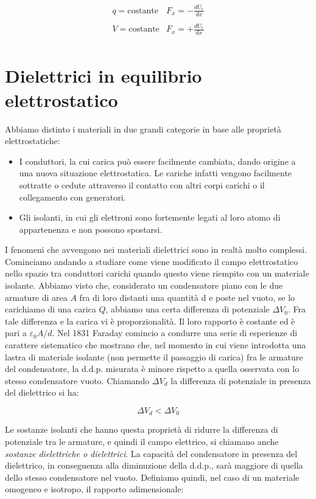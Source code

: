 \[
	\boxed{\begin{array}{rl}
		 	q = \text{costante} & F_x = - \frac{dU_e}{dx} \\ \\
			V = \text{costante} & F_x = + \frac{dU_e}{dx} \\
		\end{array}}
\]

\section{Dielettrici in equilibrio elettrostatico}

Abbiamo distinto i materiali in due grandi categorie in base alle proprietà elettrostatiche:

\begin{itemize}
	\item I conduttori, la cui carica può essere facilmente cambiata, dando origine a una nuova situazione elettrostatica. Le cariche infatti vengono facilmente sottratte o cedute attraverso il contatto con altri corpi carichi o il collegamento con generatori.
	\item Gli isolanti, in cui gli elettroni sono fortemente legati al loro atomo di appartenenza e non possono spostarsi.
\end{itemize}

I fenomeni che avvengono nei materiali dielettrici sono in realtà molto complessi. Cominciamo andando a studiare come viene modificato il campo elettrostatico nello spazio tra conduttori carichi quando questo viene riempito con un materiale isolante. Abbiamo visto che, considerato un condensatore piano con le due armature di area $A$ fra di loro distanti una quantità d e poste nel vuoto, se lo carichiamo di una carica $Q$, abbiamo una certa differenza di potenziale $\Delta V_0 $. Fra tale differenza e la carica vi è proporzionalità. Il loro rapporto è costante ed è pari a $ \varepsilon_0 A / d $. Nel 1831 Faraday comincio a condurre una serie di esperienze di carattere sistematico che mostrano che, nel momento in cui viene introdotta una lastra di materiale isolante (non permette il passaggio di carica) fra le armature del condensatore, la d.d.p. misurata è minore rispetto a quella osservata con lo stesso condensatore vuoto. Chiamando $ \Delta V_d  $ la differenza di potenziale in presenza del dielettrico si ha:

\[
	\Delta V_d < \Delta V_0
\]

Le sostanze isolanti che hanno questa proprietà di ridurre la differenza di potenziale tra le armature, e quindi il campo elettrico, si chiamano anche \emph{sostanze dielettriche o dielettrici}. La capacità del condensatore in presenza del dielettrico, in conseguenza alla diminuzione della d.d.p., sarà maggiore di quella dello stesso condensatore nel vuoto. Definiamo quindi, nel caso di un materiale omogeneo e isotropo, il rapporto adimensionale:

